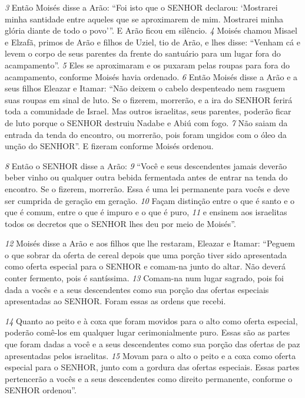 \smallskip 
\textit{\tiny 3} 
Então Moisés disse a Arão: “Foi isto que o SENHOR declarou:
    ‘Mostrarei minha santidade
      entre aqueles que se aproximarem de mim.
    Mostrarei minha glória
      diante de todo o povo’”.
E Arão ficou em silêncio. 
\textit{\tiny 4} 
Moisés chamou Misael e Elzafã, primos de Arão e filhos de Uziel, tio de Arão, e
lhes disse: “Venham cá e levem o corpo de seus parentes da frente do santuário
para um lugar fora do acampamento”. 
\textit{\tiny 5} 
Eles se aproximaram e os puxaram pelas
roupas para fora do acampamento, conforme Moisés havia ordenado. 
\textit{\tiny 6} 
Então Moisés disse a Arão e a seus filhos Eleazar e Itamar: “Não deixem o
cabelo despenteado
 nem rasguem suas roupas em sinal de luto. Se o fizerem,
morrerão, e a ira do SENHOR ferirá toda a comunidade de Israel. Mas outros
israelitas, seus parentes, poderão ficar de luto porque o SENHOR destruiu Nadabe e
Abiú com fogo. 
\textit{\tiny 7} 
Não saiam da entrada da tenda do encontro, ou morrerão, pois
foram ungidos com o óleo da unção do SENHOR”. E fizeram conforme Moisés
ordenou.

\smallskip 
\textit{\tiny 8} 
Então o SENHOR disse a Arão: 
\textit{\tiny 9} 
“Você e seus descendentes jamais deverão beber
vinho ou qualquer outra bebida fermentada antes de entrar na tenda do encontro.
Se o fizerem, morrerão. Essa é uma lei permanente para vocês e deve ser
cumprida de geração em geração. 
\textit{\tiny 10}
Façam distinção entre o que é santo e o que é
comum, entre o que é impuro e o que é puro, 
\textit{\tiny 11}
e ensinem aos israelitas todos os
decretos que o SENHOR lhes deu por meio de Moisés”.

\smallskip 
\textit{\tiny 12}
Moisés disse a Arão e aos filhos que lhe restaram, Eleazar e Itamar: “Peguem
o que sobrar da oferta de cereal depois que uma porção tiver sido apresentada
como oferta especial para o SENHOR e comam-na junto do altar. Não deverá conter
fermento, pois é santíssima. 
\textit{\tiny 13}
Comam-na num lugar sagrado, pois foi dada a
vocês e a seus descendentes como sua porção das ofertas especiais apresentadas
ao SENHOR. Foram essas as ordens que recebi. 

\smallskip 
\textit{\tiny 14}
Quanto ao peito e à coxa que
foram movidos para o alto como oferta especial, poderão comê-los em qualquer
lugar cerimonialmente puro. Essas são as partes que foram dadas a você e a seus
descendentes como sua porção das ofertas de paz apresentadas pelos israelitas.
\textit{\tiny 15}
Movam para o alto o peito e a coxa como oferta especial para o SENHOR, junto
com a gordura das ofertas especiais. Essas partes pertencerão a vocês e a seus
descendentes como direito permanente, conforme o SENHOR ordenou”.

